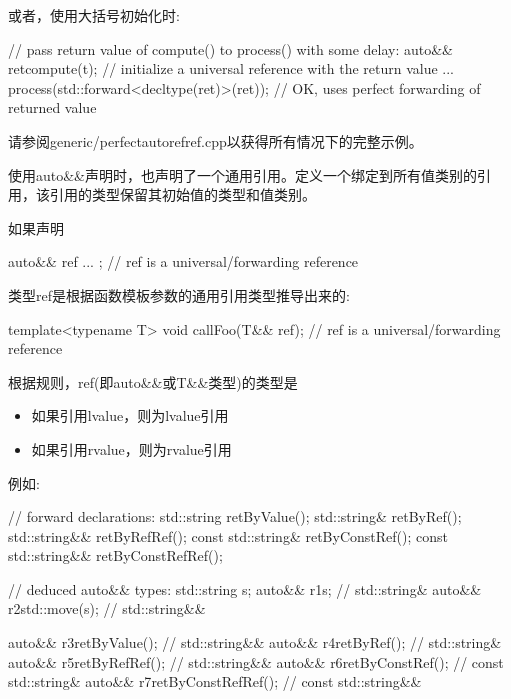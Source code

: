 或者，使用大括号初始化时:\par

\begin{codebox}[cpp]
// pass return value of compute() to process() with some delay:
auto&& ret{compute(t)}; // initialize a universal reference with the return value
...
process(std::forward<decltype(ret)>(ret)); // OK, uses perfect forwarding of returned value
\end{codebox}

请参阅generic/perfectautorefref.cpp以获得所有情况下的完整示例。\par


使用auto\&\&声明时，也声明了一个通用引用。定义一个绑定到所有值类别的引用，该引用的类型保留其初始值的类型和值类别。\par

如果声明\par

\begin{codebox}[cpp]
auto&& ref{ ... }; // ref is a universal/forwarding reference
\end{codebox}

类型ref是根据函数模板参数的通用引用类型推导出来的:\par

\begin{codebox}[cpp]
template<typename T>
void callFoo(T&& ref); // ref is a universal/forwarding reference
\end{codebox}

根据规则，ref(即auto\&\&或T\&\&类型)的类型是\par

\begin{itemize}
  \item 如果引用lvalue，则为lvalue引用
  \item 如果引用rvalue，则为rvalue引用
\end{itemize}

例如:\par

\begin{codebox}[cpp]
// forward declarations:
std::string retByValue();
std::string& retByRef();
std::string&& retByRefRef();
const std::string& retByConstRef();
const std::string&& retByConstRefRef();

// deduced auto&& types:
std::string s;
auto&& r1{s}; // std::string&
auto&& r2{std::move(s)}; // std::string&&

auto&& r3{retByValue()}; // std::string&&
auto&& r4{retByRef()}; // std::string&
auto&& r5{retByRefRef()}; // std::string&&
auto&& r6{retByConstRef()}; // const std::string&
auto&& r7{retByConstRefRef()}; // const std::string&&
\end{codebox}

